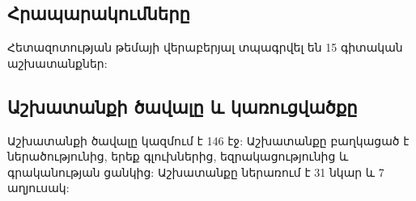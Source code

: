 \subsection*{Հրապարակումները}
Հետազոտության թեմայի վերաբերյալ տպագրվել են 15 գիտական աշխատանքներ:


\subsection*{Աշխատանքի ծավալը և կառուցվածքը}
Աշխատանքի ծավալը կազմում է 146 էջ: Աշխատանքը բաղկացած է ներածությունից, երեք գլուխներից, եզրակացությունից և գրականության ցանկից: Աշխատանքը ներառում է 31 նկար և 7 աղյուսակ:



